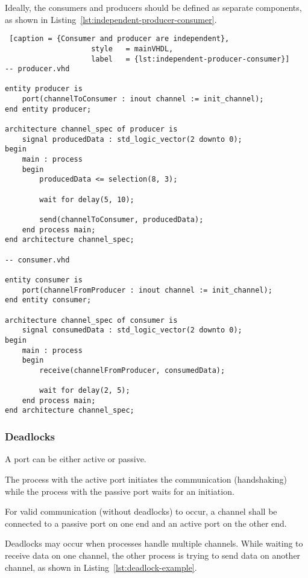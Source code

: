 \documentclass{report}
\begin{document}
Ideally, the consumers and producers should be defined as separate components,
as shown in Listing~\ref{lst:independent-producer-consumer}.

\begin{lstlisting} [caption = {Consumer and producer are independent},
                    style   = mainVHDL,
                    label   = {lst:independent-producer-consumer}]
-- producer.vhd

entity producer is
    port(channelToConsumer : inout channel := init_channel);
end entity producer;

architecture channel_spec of producer is
    signal producedData : std_logic_vector(2 downto 0);
begin
    main : process
    begin
        producedData <= selection(8, 3);

        wait for delay(5, 10);

        send(channelToConsumer, producedData);
    end process main;
end architecture channel_spec;

-- consumer.vhd

entity consumer is
    port(channelFromProducer : inout channel := init_channel);
end entity consumer;

architecture channel_spec of consumer is
    signal consumedData : std_logic_vector(2 downto 0);
begin
    main : process
    begin
        receive(channelFromProducer, consumedData);

        wait for delay(2, 5);
    end process main;
end architecture channel_spec;
\end{lstlisting}


\subsubsection{Deadlocks}

A port can be either active or passive.

The process with the active port initiates the communication (handshaking) while
the process with the passive port waits for an initiation.

For valid communication (without deadlocks) to occur, a channel shall be
connected to a passive port on one end and an active port on the other end.

Deadlocks may occur when processes handle multiple channels. While waiting to
receive data on one channel, the other process is trying to send data on another
channel, as shown in Listing~\ref{lst:deadlock-example}.
\end{document}
